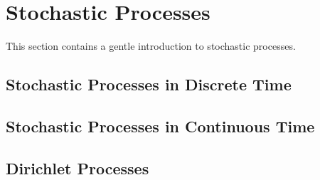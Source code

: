 \section{Stochastic Processes}\label{3}
This section contains a gentle introduction to stochastic processes.
\subsection{Stochastic Processes in Discrete Time}
\subsection{Stochastic Processes in Continuous Time}
\subsection{Dirichlet Processes}